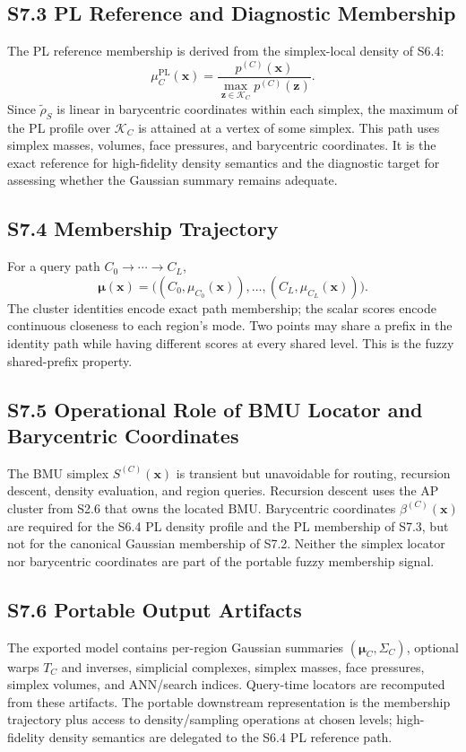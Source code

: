 \documentclass[11pt]{article}
\begin{document}
\subsection*{S7.3 PL Reference and Diagnostic Membership}
The PL reference membership is derived from the simplex-local density of S6.4:
\[
\mu_C^{\mathrm{PL}}(\mathbf x)=
\frac{p^{(C)}(\mathbf x)}{\max_{\mathbf z\in\mathcal K_C}p^{(C)}(\mathbf z)}.
\]
Since $\widetilde\rho_S$ is linear in barycentric coordinates within each simplex, the maximum of the PL profile over $\mathcal K_C$ is attained at a vertex of some simplex. This path uses simplex masses, volumes, face pressures, and barycentric coordinates. It is the exact reference for high-fidelity density semantics and the diagnostic target for assessing whether the Gaussian summary remains adequate.

\subsection*{S7.4 Membership Trajectory}
For a query path $C_0\to\cdots\to C_L$,
\[
\boldsymbol\mu(\mathbf x)
=\bigl((C_0,\mu_{C_0}(\mathbf x)),\dots,(C_L,\mu_{C_L}(\mathbf x))\bigr).
\]
The cluster identities encode exact path membership; the scalar scores encode continuous closeness to each region's mode. Two points may share a prefix in the identity path while having different scores at every shared level. This is the fuzzy shared-prefix property.

\subsection*{S7.5 Operational Role of BMU Locator and Barycentric Coordinates}
The BMU simplex $S^{(C)}(\mathbf x)$ is transient but unavoidable for routing, recursion descent, density evaluation, and region queries. Recursion descent uses the AP cluster from S2.6 that owns the located BMU. Barycentric coordinates $\beta^{(C)}(\mathbf x)$ are required for the S6.4 PL density profile and the PL membership of S7.3, but not for the canonical Gaussian membership of S7.2. Neither the simplex locator nor barycentric coordinates are part of the portable fuzzy membership signal.

\subsection*{S7.6 Portable Output Artifacts}
The exported model contains per-region Gaussian summaries $(\boldsymbol\mu_C,\Sigma_C)$, optional warps $T_C$ and inverses, simplicial complexes, simplex masses, face pressures, simplex volumes, and ANN/search indices. Query-time locators are recomputed from these artifacts. The portable downstream representation is the membership trajectory plus access to density/sampling operations at chosen levels; high-fidelity density semantics are delegated to the S6.4 PL reference path.
\end{document}
